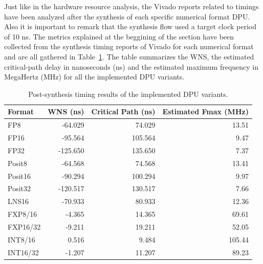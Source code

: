 
Just like in the hardware resource analysis, the Vivado reports related to timings have been analyzed after the synthesis of each specific numerical format DPU. Also it is important to remark that the synthesis flow used a target clock period of 10 ns. The metrics explained at the beggining of the section have been collected from the synthesis timing reports of Vivado for each numerical format and are all gathered in Table~\ref{tab:dpu_timing_results}. The table summarizes the WNS, the estimated critical-path delay in nanoseconds (ns) and the estimated maximum frequency in MegaHertz (MHz) for all the implemented DPU variants.

\begin{table}[htbp]
    \centering
    \caption{Post-synthesis timing results of the implemented DPU variants.}
    \label{tab:dpu_timing_results}
    \begin{tabular}{lrrr}
        \hline
        \textbf{Format} & \textbf{WNS (ns)} & \textbf{Critical Path (ns)} & \textbf{Estimated Fmax (MHz)} \\
        \hline
        FP8        & -64.029  & 74.029  & 13.51  \\
        FP16       & -95.564  & 105.564 & 9.47   \\
        FP32       & -125.650 & 135.650 & 7.37   \\
        Posit8     & -64.568  & 74.568  & 13.41  \\
        Posit16    & -90.294  & 100.294 & 9.97   \\
        Posit32    & -120.517 & 130.517 & 7.66   \\
        LNS16      & -70.933  & 80.933  & 12.36  \\
        FXP8/16    & -4.365   & 14.365  & 69.61  \\
        FXP16/32   & -9.211   & 19.211  & 52.05  \\
        INT8/16    & 0.516    & 9.484   & 105.44 \\
        INT16/32   & -1.207   & 11.207  & 89.23  \\
        \hline
    \end{tabular}
\end{table}



